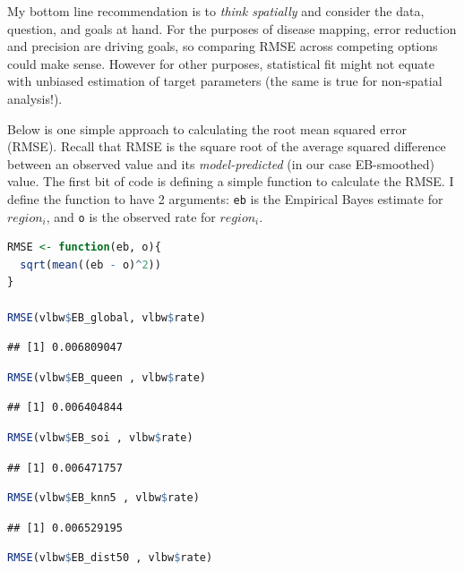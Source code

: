 \documentclass[
]{book}
\newcommand{\passthrough}[1]{#1}
\begin{document}
My bottom line recommendation is to \emph{think spatially} and consider the data, question, and goals at hand. For the purposes of disease mapping, error reduction and precision are driving goals, so comparing RMSE across competing options could make sense. However for other purposes, statistical fit might not equate with unbiased estimation of target parameters (the same is true for non-spatial analysis!).

Below is one simple approach to calculating the root mean squared error (RMSE). Recall that RMSE is the square root of the average squared difference between an observed value and its \emph{model-predicted} (in our case EB-smoothed) value. The first bit of code is defining a simple function to calculate the RMSE. I define the function to have 2 arguments: \passthrough{\lstinline!eb!} is the Empirical Bayes estimate for \(region_i\), and \passthrough{\lstinline!o!} is the observed rate for \(region_i\).

\begin{lstlisting}[language=R]
RMSE <- function(eb, o){
  sqrt(mean((eb - o)^2))
}

RMSE(vlbw$EB_global, vlbw$rate)
\end{lstlisting}

\begin{lstlisting}
## [1] 0.006809047
\end{lstlisting}

\begin{lstlisting}[language=R]
RMSE(vlbw$EB_queen , vlbw$rate)
\end{lstlisting}

\begin{lstlisting}
## [1] 0.006404844
\end{lstlisting}

\begin{lstlisting}[language=R]
RMSE(vlbw$EB_soi , vlbw$rate)
\end{lstlisting}

\begin{lstlisting}
## [1] 0.006471757
\end{lstlisting}

\begin{lstlisting}[language=R]
RMSE(vlbw$EB_knn5 , vlbw$rate)
\end{lstlisting}

\begin{lstlisting}
## [1] 0.006529195
\end{lstlisting}

\begin{lstlisting}[language=R]
RMSE(vlbw$EB_dist50 , vlbw$rate)
\end{lstlisting}
\end{document}
